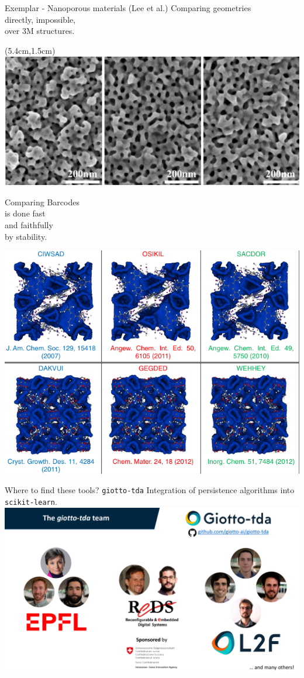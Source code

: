 \begin{frame}{Exemplar - Nanoporous materials (Lee et al.)}
	\pause
	\textcolor{pblue}{Comparing geometries} \\
	directly, impossible, \\
	over 3M structures.

	\begin{textblock*}{4cm}(5.4cm,1.5cm)
		\includegraphics[scale=.28]{aux/real_material}
	\end{textblock*}

	\pause\vspace*{2cm}
	\textcolor{pblue}{Comparing Barcodes} \\
	is done fast \\
	and faithfully \\
	by stability.

	\vspace*{-2.3cm}\hspace*{3.8cm}
	\includegraphics[scale=.6]{aux/nanoporous}
\end{frame}

\begin{frame}{Where to find these tools? \texttt{giotto-tda}}
	\pause
	Integration of persistence algorithms into \texttt{scikit-learn}.
	\vskip 10pt
	\includegraphics[scale=.31]{aux/giotto}
\end{frame}